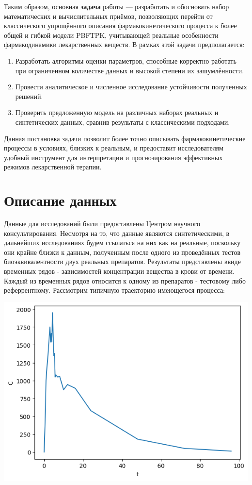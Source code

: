 \documentclass[12pt]{article}
\begin{document}
Таким образом, основная \textbf{задача} работы --- разработать и обосновать набор математических и вычислительных приёмов, позволяющих перейти от классического упрощённого описания фармакокинетического процесса к более общей и гибкой модели PBFTPK, учитывающей реальные особенности фармакодинамики лекарственных веществ. В рамках этой задачи предполагается:

\begin{enumerate}
	\item Разработать алгоритмы оценки параметров, способные корректно работать при ограниченном количестве данных и высокой степени их зашумлённости.
	\item Провести аналитическое и численное исследование устойчивости полученных решений.
	\item Проверить предложенную модель на различных наборах реальных и синтетических данных, сравнив результаты с классическими подходами.
\end{enumerate}

Данная постановка задачи позволит более точно описывать фармакокинетические процессы в условиях, близких к реальным, и предоставит исследователям удобный инструмент для интерпретации и прогнозирования эффективных режимов лекарственной терапии.

\newpage

\section{Описание данных}

Данные для исследований были предоставлены Центром научного консультирования. Несмотря на то, что данные являются синтетическими, в дальнейших исследованиях будем ссылаться на них как на реальные, поскольку они крайне близки к данным, полученным после одного из проведённых тестов биоэквивалентности двух реальных препаратов. Результаты представлены ввиде временных рядов - зависимостей концентрации вещества в крови от времени. Каждый из временных рядов относится к одному из препаратов - тестовому либо реферрентному. Рассмотрим типичную траекторию имеющегося процесса:

\includegraphics[]{sample.png}
\end{document}
